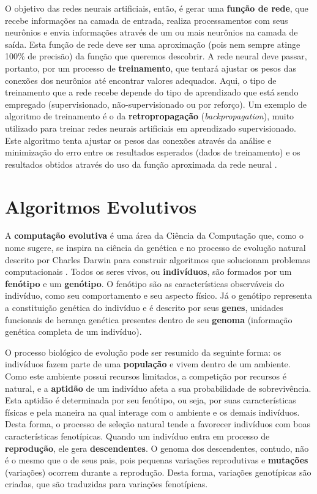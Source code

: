 O objetivo das redes neurais artificiais, então, é gerar uma \textbf{função de
rede}, que recebe informações na camada de entrada, realiza processamentos com
seus neurônios e envia informações através de um ou mais neurônios na camada de
saída. Esta função de rede deve ser uma aproximação (pois nem sempre atinge
100\% de precisão) da função que queremos descobrir. A rede neural deve passar,
portanto, por um processo de \textbf{treinamento}, que tentará ajustar os pesos
das conexões dos neurônios até encontrar valores adequados. Aqui, o tipo de
treinamento que a rede recebe depende do tipo de aprendizado que está sendo
empregado (supervisionado, não-supervisionado ou por reforço). Um exemplo de
algoritmo de treinamento é o da \textbf{retropropagação}
(\textit{backpropagation}), muito utilizado para treinar redes neurais
artificiais em aprendizado supervisionado. Este algoritmo tenta ajustar os pesos
das conexões através da análise e minimização do erro entre os resultados
esperados (dados de treinamento) e os resultados obtidos através do uso da
função aproximada da rede neural \cite[Cap. 7]{Rojas:1996:NNS:235222}.


\section{\label{section:evolutionary-algorithms}Algoritmos Evolutivos}
A \textbf{computação evolutiva} é uma área da Ciência da Computação que, como o
nome sugere, se inspira na ciência da genética e no processo de evolução
natural descrito por Charles Darwin para construir algoritmos que solucionam
problemas computacionais \cite[Cap. 2]{IntroEvolComputing}. Todos os seres
vivos, ou \textbf{indivíduos}, são formados por um \textbf{fenótipo} e um
\textbf{genótipo}. O fenótipo são as características observáveis do indivíduo,
como seu comportamento e seu aspecto físico. Já o genótipo representa a
constituição genética do indivíduo e é descrito por seus \textbf{genes},
unidades funcionais de herança genética presentes dentro de seu \textbf{genoma}
(informação genética completa de um indivíduo). 

O processo biológico de evolução pode ser resumido da seguinte forma: os
indivíduos fazem parte de uma \textbf{população} e vivem dentro de um ambiente.
Como este ambiente possui recursos limitados, a competição por recursos é
natural, e a \textbf{aptidão} de um indivíduo afeta a sua probabilidade de
sobrevivência. Esta aptidão é determinada por seu fenótipo, ou seja, por suas
características físicas e pela maneira na qual interage com o ambiente e os
demais indivíduos. Desta forma, o processo de seleção natural tende a favorecer
indivíduos com boas características fenotípicas.  Quando um indivíduo entra em
processo de \textbf{reprodução}, ele gera \textbf{descendentes}. O genoma dos
descendentes, contudo, não é o mesmo que o de seus pais, pois pequenas variações
reprodutivas e \textbf{mutações} (variações) ocorrem durante a reprodução. Desta
forma, variações genotípicas são criadas, que são traduzidas para variações
fenotípicas. 

